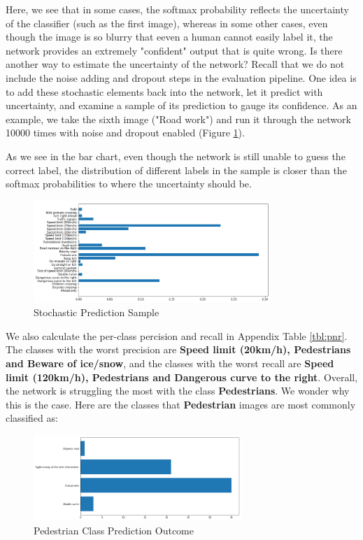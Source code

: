 \documentclass[]{article}
\begin{document}
Here, we see that in some cases, the softmax probability reflects the uncertainty of the classifier (such as the first image), whereas in some other cases, even though the image is so blurry that eeven a human cannot easily label it, the network provides an extremely "confident" output that is quite wrong. Is there another way to estimate the uncertainty of the network? Recall that we do not include the noise adding and dropout steps in the evaluation pipeline. One idea is to add these stochastic elements back into the network, let it predict with uncertainty, and examine a sample of its prediction to gauge its confidence. As an example, we take the sixth image ("Road work") and run it through the network 10000 times with noise and dropout enabled (Figure \ref{fig:sto}).

As we see in the bar chart, even though the network is still unable to guess the correct label, the distribution of different labels in the sample is closer than the softmax probabilities to where the uncertainty should be.

\begin{figure}[H]
	\centering
	\includegraphics[width=0.8\textwidth]{rw}
	\caption{Stochastic Prediction Sample}
	\label{fig:sto}
\end{figure}

We also calculate the per-class percision and recall in Appendix Table \ref{tbl:pnr}. The classes with the worst precision are \textbf{Speed limit (20km/h), Pedestrians and Beware of ice/snow}, and the classes with the worst recall are \textbf{Speed limit (120km/h), Pedestrians and Dangerous curve to the right}. Overall, the network is struggling the most with the class \textbf{Pedestrians}. We wonder why this is the case. Here are the classes that \textbf{Pedestrian} images are most commonly classified as:

\begin{figure}[H]
	\centering
	\includegraphics[width=0.7\textwidth]{ped}
	\caption{Pedestrian Class Prediction Outcome}
	\label{fig:ped}
\end{figure}
\end{document}
